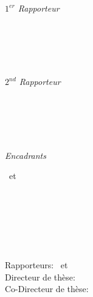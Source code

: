 \begin{titlepage}
	\vfill
	\begin{minipage}[t]{.27\textwidth}
		\raggedleft
		\textit{$1^{er}$ Rapporteur}
	\end{minipage}
	\hspace*{15pt}
	\begin{minipage}[t]{.65\textwidth}
		{\Large \thesisFirstReviewer} \\
	  	{\small \thesisFirstReviewerDepartment} \\[-1mm]
		{\small \thesisFirstReviewerUniversity}
	\end{minipage} \\[5mm]
	\begin{minipage}[t]{.27\textwidth}
		\raggedleft
		\textit{$2^{nd}$ Rapporteur}
	\end{minipage}
	\hspace*{15pt}
	\begin{minipage}[t]{.65\textwidth}
		{\Large \thesisSecondReviewer} \\
	  	{\small \thesisSecondReviewerDepartment} \\[-1mm]
		{\small \thesisSecondReviewerUniversity}
	\end{minipage} \\[10mm]
	\begin{minipage}[t]{.27\textwidth}
		\raggedleft
		\textit{Encadrants}
	\end{minipage}
	\hspace*{15pt}
	\begin{minipage}[t]{.65\textwidth}
		\thesisFirstSupervisor\ et \thesisSecondSupervisor
	\end{minipage} \\[10mm]

	\thesisDate \\

\end{titlepage}


\hfill
\vfill
{
	\small
	\textit{\thesisTitle} \\
    \thesisName \textcopyright\ \thesisDate \\
	\thesisSubject\\
	Rapporteurs: \thesisFirstReviewer\ et \thesisSecondReviewer \\
	Directeur de th\`ese: \thesisFirstSupervisor\\
    Co-Directeur de th\`ese: \thesisSecondSupervisor \\[1.5em]
	\textbf{\thesisUniversity} \\
    \thesisUniversityDepartment \\[1.5em]
    \textbf{\thesisUniversityGroup} \\
	\thesisUniversityInstitute \\
    \thesisUniversityStreetAddress \\
	\thesisUniversityPostalCode\ \thesisUniversityCity
}
